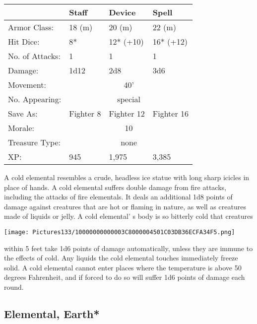 \documentclass[a4paper,twoside,openany,10pt]{book}
\begin{document}
\begin{multicols}{2}
\begin{tabularx}{0.48\textwidth}{@{}lllX@{}}
& Staff & Device & Spell \\\hline
Armor Class: & 18 (m) & 20 (m) & 22 (m) \\\hline
Hit Dice: & 8* & 12* (+10) & 16* (+12) \\\hline
No. of Attacks: & 1 & 1 & 1 \\\hline
Damage: & 1d12 & 2d8 & 3d6 \\\hline
Movement: & \multicolumn{3}{c}{40'} \\\hline
No. Appearing: &\multicolumn{3}{c}{special} \\\hline
Save As: & Fighter 8 & Fighter 12 & Fighter 16 \\\hline
Morale: & \multicolumn{3}{c}{10} \\\hline
Treasure Type: & \multicolumn{3}{c}{none} \\\hline
XP: & 945 & 1,975 & 3,385 \\\hline
\end{tabularx}\medskip

A cold elemental resembles a crude, headless ice statue with long sharp icicles in place of hands. A cold elemental suffers double damage from fire attacks, including the attacks of fire elementals. It deals an additional 1d8 points of damage against creatures that are hot or flaming in nature, as well as creatures made of liquids or jelly. A cold elemental' s body is so bitterly cold that creatures

\begin{center}
	\texttt{[image: Pictures133/10000000000003C8000004501C03DB36ECFA34F5.png]}
\end{center}

within 5 feet take 1d6 points of damage automatically, unless they are immune to the effects of cold. Any liquids the cold elemental touches immediately freeze solid. A cold elemental cannot enter places where the temperature is above 50 degrees Fahrenheit, and if forced to do so will suffer 1d6 points of damage each round.


\subsection*{Elemental, Earth*}\label{elemental-earth}


\end{multicols}
\end{document}
